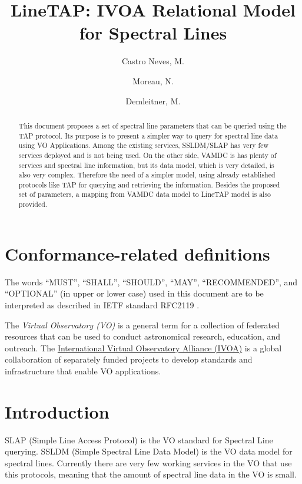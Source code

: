 \documentclass[11pt,a4paper]{ivoa}
\title{LineTAP: IVOA Relational Model for Spectral Lines}
\author{Castro Neves, M.}
\author{Moreau, N.}
\author{Demleitner, M.}
\begin{document}
\begin{abstract}

This document proposes a set of  spectral line parameters that can be queried using the 
TAP protocol. Its purpose is to present a simpler way to query for spectral line data using 
VO Applications. Among the existing services, SSLDM/SLAP has very few services 
deployed and is not being used. On the other side, VAMDC is has plenty of services and 
spectral line information, but its data model, which is very detailed, is also very complex.
Therefore the need of a  simpler model, using already established protocols like TAP for 
querying and retrieving the information. Besides the proposed set of parameters, a mapping 
from VAMDC data model to LineTAP model is also provided.

\end{abstract}




\section*{Conformance-related definitions}

The words ``MUST'', ``SHALL'', ``SHOULD'', ``MAY'', ``RECOMMENDED'', and
``OPTIONAL'' (in upper or lower case) used in this document are to be
interpreted as described in IETF standard RFC2119 \citep{std:RFC2119}.

The \emph{Virtual Observatory (VO)} is a
general term for a collection of federated resources that can be used
to conduct astronomical research, education, and outreach.
The \href{http://www.ivoa.net}{International
Virtual Observatory Alliance (IVOA)} is a global
collaboration of separately funded projects to develop standards and
infrastructure that enable VO applications.


\section{Introduction}

SLAP (Simple Line Access Protocol)\citep{2010ivoa.specQ1209O} is the VO standard for 
Spectral Line querying. SSLDM (Simple Spectral Line Data 
Model)\citep{2010ivoa.spec.1209O} 
is the VO data model for spectral lines.
Currently there are very few working services in the VO that use this protocols, meaning 
that the amount of spectral line data in the VO is small. 
\end{document}
